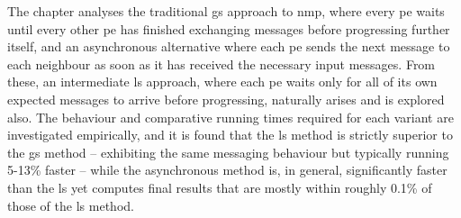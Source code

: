 The chapter analyses the traditional \gls{gs} approach to \gls{nmp}, where every \gls{pe} waits until every other \gls{pe} has finished exchanging messages before progressing further itself, and an asynchronous alternative where each \gls{pe} sends the next message to each neighbour as soon as it has received the necessary input messages.  From these, an intermediate \gls{ls} approach, where each \gls{pe} waits only for all of its own expected messages to arrive before progressing, naturally arises and is explored also.  The behaviour and comparative running times required for each variant are investigated empirically, and it is found that the \gls{ls} method is strictly superior to the \gls{gs} method -- exhibiting the same messaging behaviour but typically running 5-13\% faster -- while the asynchronous method is, in general, significantly faster than the \gls{ls} yet computes final results that are mostly within roughly 0.1\% of those of the \gls{ls} method.